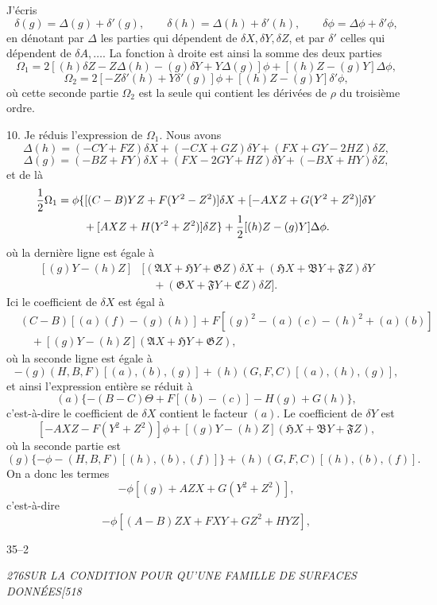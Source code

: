 \documentclass[11pt]{article}
\newcommand{\phead}[3]{\noindent\textit{#1\hfill #2\hfill #3}\par\medskip}
\newcommand{\D}{\delta}
\newcommand{\Dp}{\delta'}
\newcommand{\Del}{\Delta}
\newcommand{\frA}{\mathfrak A}
\newcommand{\frB}{\mathfrak B}
\newcommand{\frC}{\mathfrak C}
\newcommand{\frF}{\mathfrak F}
\newcommand{\frG}{\mathfrak G}
\newcommand{\frH}{\mathfrak H}
\begin{document}
J'\'ecris
\[
\D(g)=\Del(g)+\Dp(g),\qquad
\D(h)=\Del(h)+\Dp(h),\qquad
\D\phi=\Del\phi+\Dp\phi,
\]
en d\'enotant par $\Del$ les parties qui d\'ependent de $\D X,\D Y,\D Z$, et par $\Dp$ celles qui
d\'ependent de $\D A,\ldots$. La fonction \`a droite est ainsi la somme des deux parties
\[
\Omega_1=2[(h)\D Z-Z\Del(h)-(g)\D Y+Y\Del(g)]\phi+[(h)Z-(g)Y]\Del\phi,
\]
\[
\Omega_2=2[-Z\Dp(h)+Y\Dp(g)]\phi+[(h)Z-(g)Y]\Dp\phi,
\]
o\`u cette seconde partie $\Omega_2$ est la seule qui contient les d\'eriv\'ees de $\rho$ du
troisi\`eme ordre.

10. Je r\'eduis l'expression de $\Omega_1$. Nous avons
\[
\Del(h)=(-CY+FZ)\D X+(-CX+GZ)\D Y+(FX+GY-2HZ)\D Z,
\]
\[
\Del(g)=(-BZ+FY)\D X+(FX-2GY+HZ)\D Y+(-BX+HY)\D Z,
\]
et de l\`a
\[
\begin{split}
{1\over2}\Omega_1={}&\phi\{[(C-B)YZ+F(Y^2-Z^2)]\D X
+[-AXZ+G(Y^2+Z^2)]\D Y\\
&\quad+[AXZ+H(Y^2+Z^2)]\D Z\}
+{1\over2}[(h)Z-(g)Y]\Del\phi .
\end{split}
\]
o\`u la derni\`ere ligne est \'egale \`a
\[
\begin{split}
[(g)Y-(h)Z]&[(\frA X+\frH Y+\frG Z)\D X
+(\frH X+\frB Y+\frF Z)\D Y\\
&\quad+(\frG X+\frF Y+\frC Z)\D Z].
\end{split}
\]
Ici le coefficient de $\D X$ est \'egal \`a
\[
\begin{split}
&(C-B)[(a)(f)-(g)(h)]+F[(g)^2-(a)(c)-(h)^2+(a)(b)]\\
&\quad+[(g)Y-(h)Z](\frA X+\frH Y+\frG Z),
\end{split}
\]
o\`u la seconde ligne est \'egale \`a
\[
-(g)(H,B,F)[(a),(b),(g)]+(h)(G,F,C)[(a),(h),(g)],
\]
et ainsi l'expression enti\`ere se r\'eduit \`a
\[
(a)\{-(B-C)\Theta+F[(b)-(c)]-H(g)+G(h)\},
\]
c'est-\`a-dire le coefficient de $\D X$ contient le facteur $(a)$.
Le coefficient de $\D Y$ est
\[
[-AXZ-F(Y^2+Z^2)]\phi+[(g)Y-(h)Z](\frH X+\frB Y+\frF Z),
\]
o\`u la seconde partie est
\[
(g)\{-\phi-(H,B,F)[(h),(b),(f)]\}+(h)(G,F,C)[(h),(b),(f)].
\]
On a donc les termes
\[
-\phi[(g)+AZX+G(Y^2+Z^2)],
\]
c'est-\`a-dire
\[
-\phi[(A-B)ZX+FXY+GZ^2+HYZ],
\]

\hfill 35--2
\clearpage

\phead{276}{SUR LA CONDITION POUR QU'UNE FAMILLE DE SURFACES DONN\'EES}{[518}
\end{document}
